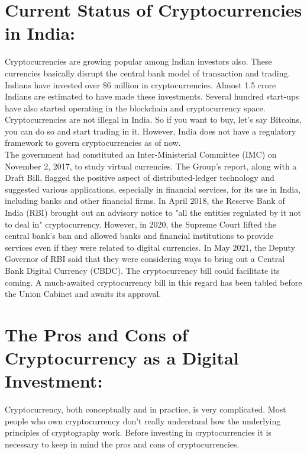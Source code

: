 \documentclass[11pt]{article}
\begin{document}
\section*{Current Status of Cryptocurrencies in India:}
Cryptocurrencies are growing popular among Indian investors also. These currencies basically disrupt the central bank model of transaction and trading. Indians have invested over \$6 million in cryptocurrencies. Almost 1.5 crore Indians are estimated to have made these investments. Several hundred start-ups have also started operating in the blockchain and cryptocurrency space. Cryptocurrencies are not illegal in India. So if you want to buy, let's say Bitcoins, you can do so and start trading in it. However, India does not have a regulatory framework to govern cryptocurrencies as of now. \\
\indent The government had constituted an Inter-Ministerial Committee (IMC) on November 2, 2017, to study virtual currencies. The Group's report, along with a Draft Bill, flagged the positive aspect of distributed-ledger technology and suggested various applications, especially in financial services, for its use in India, including banks and other financial firms. In April 2018, the Reserve Bank of India (RBI) brought out an advisory notice to "all the entities regulated by it not to deal in" cryptocurrency. However, in 2020, the Supreme Court lifted the central bank's ban and allowed banks and financial institutions to provide services even if they were related to digital currencies. In May 2021, the Deputy Governor of RBI said that they were considering ways to bring out a Central Bank Digital Currency (CBDC). The cryptocurrency bill could facilitate its coming. A much-awaited cryptocurrency bill in this regard has been tabled before the Union Cabinet and awaits its approval.

\section*{The Pros and Cons of Cryptocurrency as a Digital Investment:}
Cryptocurrency, both conceptually and in practice, is very complicated. Most people who own cryptocurrency don’t really understand how the underlying principles of cryptography work. Before investing in cryptocurrencies it is necessary to keep in mind the pros and cons of cryptocurrencies.
\end{document}
